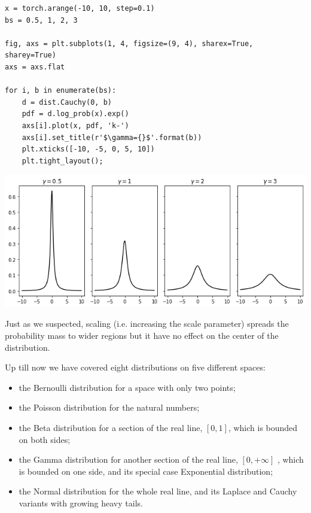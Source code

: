 \documentclass[11pt]{article}
\begin{document}
\begin{enumerate}
\begin{verbatim}
x = torch.arange(-10, 10, step=0.1)
bs = 0.5, 1, 2, 3

fig, axs = plt.subplots(1, 4, figsize=(9, 4), sharex=True, sharey=True)
axs = axs.flat

for i, b in enumerate(bs):
    d = dist.Cauchy(0, b)
    pdf = d.log_prob(x).exp()
    axs[i].plot(x, pdf, 'k-')
    axs[i].set_title(r'$\gamma={}$'.format(b))
    plt.xticks([-10, -5, 0, 5, 10])
    plt.tight_layout();
\end{verbatim}

\begin{center}
\includegraphics[width=.9\linewidth]{./.ob-jupyter/a8734fc48b326adc9fec6deceb27c7a13207522b.png}
\end{center}

Just as we suspected, scaling (i.e. increasing the scale parameter) spreads the probability mass to wider regions but it have no effect on the center of the distribution.

Up till now we have covered eight distributions on five different spaces:

\begin{itemize}
\item the Bernoulli distribution for a space with only two points;
\item the Poisson distribution for the natural numbers;
\item the Beta distribution for a section of the real line, \([0, 1]\), which is bounded on both sides;
\item the Gamma distribution for another section of the real line, \([0, +\infty]\) , which is bounded on one side, and its special case Exponential distribution;
\item the Normal distribution for the whole real line, and its Laplace and Cauchy variants with growing heavy tails.
\end{itemize}


\end{enumerate}
\end{document}
